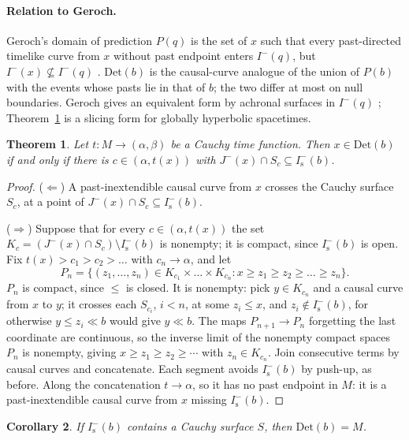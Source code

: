 \documentclass[11pt]{article}
\newtheorem{theorem}{Theorem}
\newtheorem{corollary}[theorem]{Corollary}
\theoremstyle{definition}
\newcommand{\Is}{I^-_{\mathrm s}}
\newcommand{\Det}{\mathrm{Det}}
\begin{document}
\paragraph{Relation to Geroch.} Geroch's domain of prediction $P(q)$ is the set
of $x$ such that every past-directed timelike curve from $x$ without past
endpoint enters $I^-(q)$, but $I^-(x)\not\subseteq I^-(q)$ \citep[sec.~3]{Geroch1977}.
$\Det(b)$ is the causal-curve analogue of the union of $P(b)$ with the
events whose pasts lie in that of $b$; the two differ at most on null
boundaries. Geroch gives an equivalent form by achronal surfaces in $I^-(q)$
\citep[sec.~3]{Geroch1977}; Theorem~\ref{thm:char} is a slicing form for
globally hyperbolic spacetimes.

\begin{theorem}\label{thm:char}
Let $t:M\to(\alpha,\beta)$ be a Cauchy time function. Then $x\in\Det(b)$ if
and only if there is $c\in(\alpha,t(x))$ with $J^-(x)\cap S_c\subseteq\Is(b)$.
\end{theorem}

\begin{proof}
($\Leftarrow$) A past-inextendible causal curve from $x$ crosses the Cauchy
surface $S_c$, at a point of $J^-(x)\cap S_c\subseteq\Is(b)$.

($\Rightarrow$) Suppose that for every $c\in(\alpha,t(x))$ the set
$K_c=(J^-(x)\cap S_c)\setminus\Is(b)$ is nonempty; it is compact, since
$\Is(b)$ is open. Fix $t(x)>c_1>c_2>\dots$ with $c_n\to\alpha$, and let
\[P_n=\{(z_1,\dots,z_n)\in K_{c_1}\times\dots\times K_{c_n}:
x\ge z_1\ge z_2\ge\dots\ge z_n\}.\]
$P_n$ is compact, since $\le$ is closed. It is nonempty: pick $y\in K_{c_n}$
and a causal curve from $x$ to $y$; it crosses each $S_{c_i}$, $i<n$, at some
$z_i\le x$, and $z_i\notin\Is(b)$, for otherwise $y\le z_i\ll b$ would give
$y\ll b$. The maps $P_{n+1}\to P_n$ forgetting the last coordinate are
continuous, so the inverse limit of the nonempty compact spaces $P_n$ is
nonempty, giving $x\ge z_1\ge z_2\ge\cdots$ with $z_n\in K_{c_n}$. Join
consecutive terms by causal curves and concatenate. Each segment avoids
$\Is(b)$ by push-up, as before. Along the concatenation $t\to\alpha$, so it has
no past endpoint in $M$: it is a past-inextendible causal curve from $x$
missing $\Is(b)$.
\end{proof}

\begin{corollary}\label{cor:cauchy}
If $\Is(b)$ contains a Cauchy surface $S$, then $\Det(b)=M$.
\end{corollary}
\end{document}

